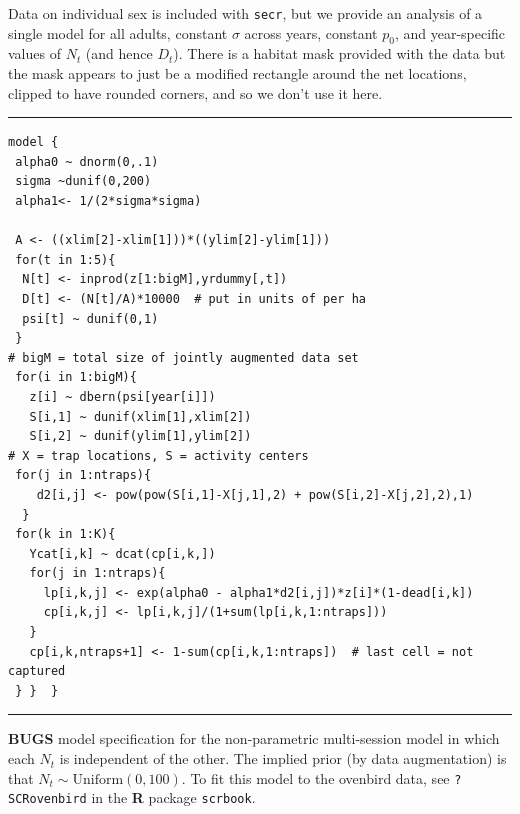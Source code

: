 Data on individual sex is included
with \mbox{\tt secr}, but  we provide an analysis of a single model
for all adults, constant $\sigma$ across years, constant $p_{0}$, and
year-specific values of $N_{t}$ (and hence $D_{t}$). 
 There is a habitat mask provided with the data but the mask
appears to just be a modified rectangle around the net locations,
clipped to have rounded corners, and so we don't use it here. 






\begin{panel}[htp]
\centering
\rule[0.15in]{\textwidth}{.03in}
{\small
\begin{verbatim}
model {
 alpha0 ~ dnorm(0,.1)
 sigma ~dunif(0,200)
 alpha1<- 1/(2*sigma*sigma)

 A <- ((xlim[2]-xlim[1]))*((ylim[2]-ylim[1]))
 for(t in 1:5){
  N[t] <- inprod(z[1:bigM],yrdummy[,t])
  D[t] <- (N[t]/A)*10000  # put in units of per ha
  psi[t] ~ dunif(0,1)
 }
# bigM = total size of jointly augmented data set
 for(i in 1:bigM){
   z[i] ~ dbern(psi[year[i]])
   S[i,1] ~ dunif(xlim[1],xlim[2])
   S[i,2] ~ dunif(ylim[1],ylim[2])
# X = trap locations, S = activity centers
 for(j in 1:ntraps){
    d2[i,j] <- pow(pow(S[i,1]-X[j,1],2) + pow(S[i,2]-X[j,2],2),1)
  }
 for(k in 1:K){
   Ycat[i,k] ~ dcat(cp[i,k,])
   for(j in 1:ntraps){
     lp[i,k,j] <- exp(alpha0 - alpha1*d2[i,j])*z[i]*(1-dead[i,k])        
     cp[i,k,j] <- lp[i,k,j]/(1+sum(lp[i,k,1:ntraps]))
   }
   cp[i,k,ntraps+1] <- 1-sum(cp[i,k,1:ntraps])  # last cell = not captured
 } }  }
\end{verbatim}
}
\rule[-0.15in]{\textwidth}{.03in}
\caption{
{\bf BUGS} model specification for the non-parametric multi-session
model in which each $N_{t}$ is independent of the other. The implied
prior (by data augmentation) is that $N_{t} \sim
\mbox{Uniform}(0,100)$. 
To fit this model to the ovenbird data, see
 \mbox{\tt ?SCRovenbird} in the {\bf R} package \mbox{\tt scrbook}.
}
\label{poisson-mn.panel.ovenbird}
\end{panel}


